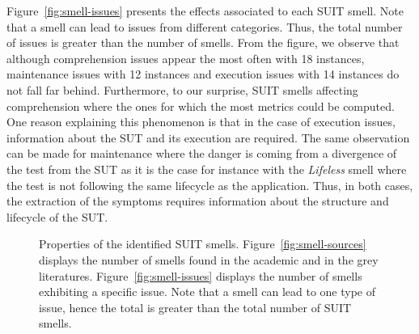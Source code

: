 Figure~\ref{fig:smell-issues} presents the effects associated to each SUIT smell. Note that a smell can lead to issues from different categories. Thus, the total number of issues is greater than the number of smells. From the figure, we observe that although comprehension issues appear the most often with 18 instances, maintenance issues with 12 instances and execution issues with 14 instances do not fall far behind. Furthermore, to our surprise, SUIT smells affecting comprehension where the ones for which the most metrics could be computed. One reason explaining this phenomenon is that in the case of execution issues, information about the SUT and its execution are required. The same observation can be made for maintenance where the danger is coming from a divergence of the test from the SUT as it is the case for instance with the \emph{Lifeless} smell \cite{Buwalda2015, Renaudin2016, Buwalda2019} where the test is not following the same lifecycle as the application. Thus, in both cases, the extraction of the symptoms requires information about the structure and lifecycle of the SUT.

\begin{figure}
\centering
{}
\caption{Properties of the identified SUIT smells. Figure~\ref{fig:smell-sources} displays the number of smells found in the academic and in the grey literatures. Figure~\ref{fig:smell-issues} displays the number of smells exhibiting a specific issue. Note that a smell can lead to one type of issue, hence the total is greater than the total number of SUIT smells.}  
\label{fig:smells}
\end{figure}

